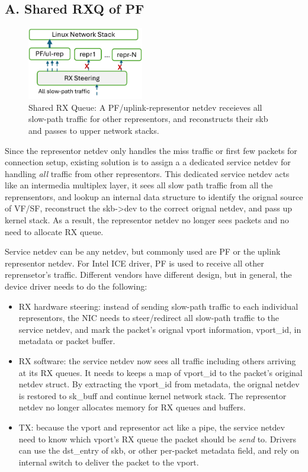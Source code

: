 \documentclass[letterpaper]{article}
\begin{document}
\subsection{A. Shared RXQ of PF}
\begin{figure}[h]
\includegraphics[width=2in]{design1.pdf}
\centering
\caption{Shared RX Queue: A PF/uplink-representor netdev receieves all slow-path traffic
for other representors, and reconstructs their skb and passes to upper
network stacks.}
\label{fig:arch}
\end{figure}

Since the representor netdev only handles the miss traffic or first
few packets for connection setup, existing solution is to assign a
a dedicated service netdev for handling \emph{all} traffic from other
representors. This dedicated service netdev acts like an intermedia
multiplex layer, it sees all slow path traffic from all the
reprensentors, and lookup an internal data structure to identify the
orignal source of VF/SF, reconstruct the skb->dev to the correct
orignal netdev, and pass up kernel stack. As a result, the representor
netdev no longer sees packets and no need to allocate RX queue.

Service netdev can be any netdev, but commonly used are PF or the uplink
representor netdev. For Intel ICE driver, PF is used to receive all other
reprensetor's traffic.
Different vendors have different design, but in general, the device
driver needs to do the following:

\begin{itemize}
\item RX hardware steering: instead of sending slow-path traffic to
each individual representors, the NIC needs to steer/redirect all
slow-path traffic to the service netdev, and mark the packet's orignal
vport information, vport\_id, in metadata or packet buffer.
\item RX software: the service netdev now sees all traffic including
others arriving at its RX queues. It needs to keeps a map of vport\_id
to the packet's original netdev struct. By extracting the vport\_id
from metadata, the orignal netdev is restored to sk\_buff and continue
kernel network stack. The representor netdev no longer allocates memory
for RX queues and buffers.
\item TX: because the vport and representor act like a pipe, the service
netdev need to know which vport's RX queue the packet should be \emph{send}
to. Drivers can use the dst\_entry of skb, or other per-packet metadata
field, and rely on internal switch to deliver the packet to the vport.
\end{itemize}
\end{document}
